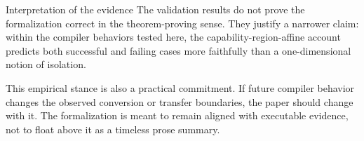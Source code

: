 \begin{propositionbox}{Interpretation of the evidence}
The validation results do not prove the formalization correct in the theorem-proving sense. They justify a narrower claim: within the compiler behaviors tested here, the capability-region-affine account predicts both successful and failing cases more faithfully than a one-dimensional notion of isolation.
\end{propositionbox}

This empirical stance is also a practical commitment. If future compiler behavior changes the observed conversion or transfer boundaries, the paper should change with it. The formalization is meant to remain aligned with executable evidence, not to float above it as a timeless prose summary.
